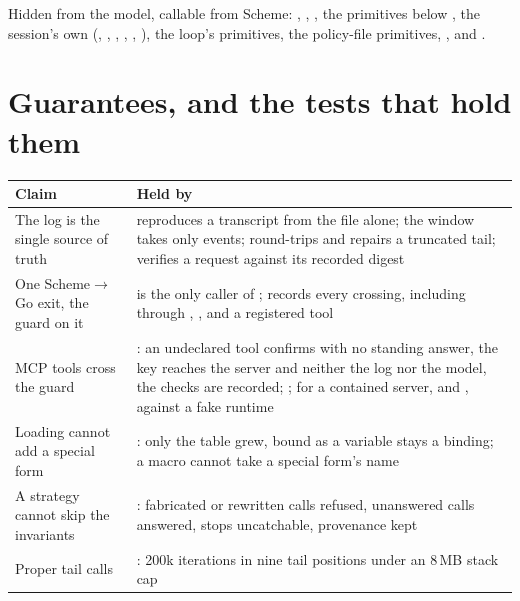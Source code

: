 \begin{sloppypar}
Hidden from the model, callable from Scheme: ,
, , the 
primitives below ,
the session's own (, ,
, , ,
), the
loop's primitives, the policy-file primitives, ,
 and .
\end{sloppypar}

\section{Guarantees, and the tests that hold them}

{\small
\begin{longtable}{@{}L{5.2cm}L{9.8cm}@{}}
\toprule
Claim & Held by \\
\midrule
\endhead
The log is the single source of truth &  reproduces a transcript from the file alone; the window takes only events;  round-trips and repairs a truncated tail;  verifies a request against its recorded digest \\
One Scheme$\to$Go exit, the guard on it &  is the only caller of ;  records every crossing, including through , ,  and a registered tool \\
MCP tools cross the guard & : an undeclared tool confirms with no standing answer, the key reaches the server and neither the log nor the model, the checks are recorded; ; for a contained server,  and , against a fake runtime \\
Loading  cannot add a special form & : only the table grew,  bound as a variable stays a binding; a macro cannot take a special form's name \\
A strategy cannot skip the invariants & : fabricated or rewritten calls refused, unanswered calls answered, stops uncatchable, provenance kept \\
Proper tail calls & : 200k iterations in nine tail positions under an 8\,MB stack cap \\

\end{longtable}}
